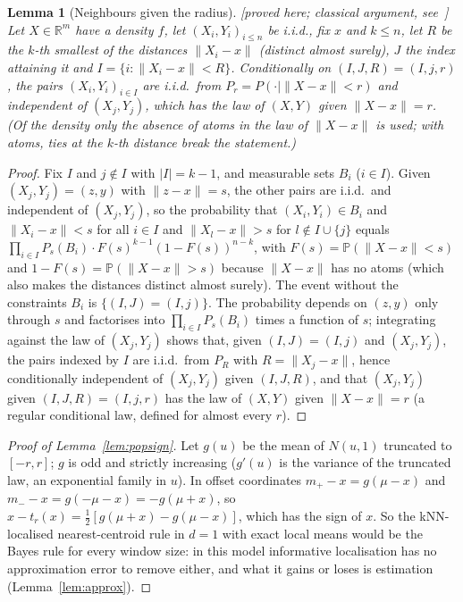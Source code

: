 \documentclass[11pt,a4paper]{article}
\theoremstyle{plain}
\newtheorem{lemma}[theorem]{Lemma}
\theoremstyle{definition}
\theoremstyle{remark}
\newcommand{\R}{\mathbb{R}}
\newcommand{\Prob}{\mathbb{P}}
\newcommand{\status}[1]{\textsf{\small [#1]}}
\begin{document}
\begin{lemma}[Neighbours given the radius]\label{lem:radius}\status{proved here; classical argument, see~\citet{biau2015}}
Let $X\in\R^m$ have a density $f$, let $(X_i,Y_i)_{i\le n}$ be i.i.d., fix $x$ and $k\le n$, let $R$ be the $k$-th smallest of the distances $\|X_i-x\|$ (distinct almost surely), $J$ the index attaining it and $I=\{i:\|X_i-x\|<R\}$. Conditionally on $(I,J,R)=(I,j,r)$, the pairs $(X_i,Y_i)_{i\in I}$ are i.i.d.\ from $P_r=P(\cdot\mid\|X-x\|<r)$ and independent of $(X_j,Y_j)$, which has the law of $(X,Y)$ given $\|X-x\|=r$. (Of the density only the absence of atoms in the law of $\|X-x\|$ is used; with atoms, ties at the $k$-th distance break the statement.)
\end{lemma}
\begin{proof}
Fix $I$ and $j\notin I$ with $|I|=k-1$, and measurable sets $B_i$ ($i\in I$). Given $(X_j,Y_j)=(z,y)$ with $\|z-x\|=s$, the other pairs are i.i.d.\ and independent of $(X_j,Y_j)$, so the probability that $(X_i,Y_i)\in B_i$ and $\|X_i-x\|<s$ for all $i\in I$ and $\|X_l-x\|>s$ for $l\notin I\cup\{j\}$ equals $\prod_{i\in I}P_s(B_i)\cdot F(s)^{k-1}(1-F(s))^{n-k}$, with $F(s)=\Prob(\|X-x\|<s)$ and $1-F(s)=\Prob(\|X-x\|>s)$ because $\|X-x\|$ has no atoms (which also makes the distances distinct almost surely). The event without the constraints $B_i$ is $\{(I,J)=(I,j)\}$. The probability depends on $(z,y)$ only through $s$ and factorises into $\prod_{i\in I}P_s(B_i)$ times a function of $s$; integrating against the law of $(X_j,Y_j)$ shows that, given $(I,J)=(I,j)$ and $(X_j,Y_j)$, the pairs indexed by $I$ are i.i.d.\ from $P_R$ with $R=\|X_j-x\|$, hence conditionally independent of $(X_j,Y_j)$ given $(I,J,R)$, and that $(X_j,Y_j)$ given $(I,J,R)=(I,j,r)$ has the law of $(X,Y)$ given $\|X-x\|=r$ (a regular conditional law, defined for almost every $r$).
\end{proof}

\begin{proof}[Proof of Lemma~\ref{lem:popsign}]
Let $g(u)$ be the mean of $N(u,1)$ truncated to $[-r,r]$; $g$ is odd and strictly increasing ($g'(u)$ is the variance of the truncated law, an exponential family in $u$). In offset coordinates $m_+-x=g(\mu-x)$ and $m_--x=g(-\mu-x)=-g(\mu+x)$, so $x-t_r(x)=\tfrac12[g(\mu+x)-g(\mu-x)]$, which has the sign of $x$. So the kNN-localised nearest-centroid rule in $d=1$ with exact local means would be the Bayes rule for every window size: in this model informative localisation has no approximation error to remove either, and what it gains or loses is estimation (Lemma~\ref{lem:approx}).
\end{proof}
\end{document}

